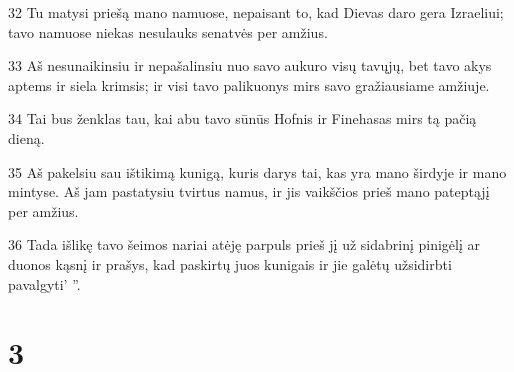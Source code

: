 \par 32 Tu matysi priešą mano namuose, nepaisant to, kad Dievas daro gera Izraeliui; tavo namuose niekas nesulauks senatvės per amžius. 
\par 33 Aš nesunaikinsiu ir nepašalinsiu nuo savo aukuro visų tavųjų, bet tavo akys aptems ir siela krimsis; ir visi tavo palikuonys mirs savo gražiausiame amžiuje. 
\par 34 Tai bus ženklas tau, kai abu tavo sūnūs Hofnis ir Finehasas mirs tą pačią dieną. 
\par 35 Aš pakelsiu sau ištikimą kunigą, kuris darys tai, kas yra mano širdyje ir mano mintyse. Aš jam pastatysiu tvirtus namus, ir jis vaikščios prieš mano pateptąjį per amžius. 
\par 36 Tada išlikę tavo šeimos nariai atėję parpuls prieš jį už sidabrinį pinigėlį ar duonos kąsnį ir prašys, kad paskirtų juos kunigais ir jie galėtų užsidirbti pavalgyti’ ”.



\chapter{3}


